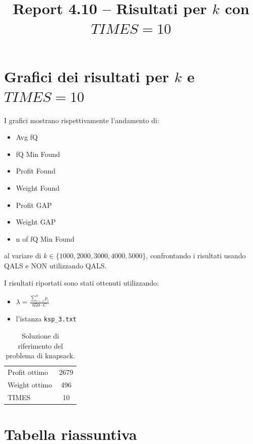 \documentclass[a4paper,12pt]{article}
\title{Report 4.10 -- Risultati per $k$ con $TIMES = 10$}
\begin{document}
\maketitle

\newpage

\section{Grafici dei risultati per $k$ e $TIMES = 10$}

I grafici mostrano rispettivamente l'andamento di:
\begin{itemize}
    \item Avg fQ
    \item fQ Min Found
    \item Profit Found
    \item Weight Found
    \item Profit GAP
    \item Weight GAP
    \item n of fQ Min Found
\end{itemize}
al variare di $k \in \{1000, 2000, 3000, 4000, 5000\}$, confrontando
i risultati usando QALS e NON utilizzando QALS.

I risultati riportati sono stati ottenuti utilizzando:

\begin{itemize}
    \item $\lambda = \frac{\sum_{i=1}^{n} p_i}{650 \cdot C}$
    \item l'istanza \texttt{ksp\_3.txt}
\end{itemize}

\begin{table}[H]
\centering
\begin{tabular}{lc}
\toprule
Profit ottimo & 2679 \\
Weight ottimo & 496 \\
TIMES & 10 \\
\bottomrule
\end{tabular}
\caption{Soluzione di riferimento del problema di knapsack.}
\end{table}

\section{Tabella riassuntiva}
\end{document}
